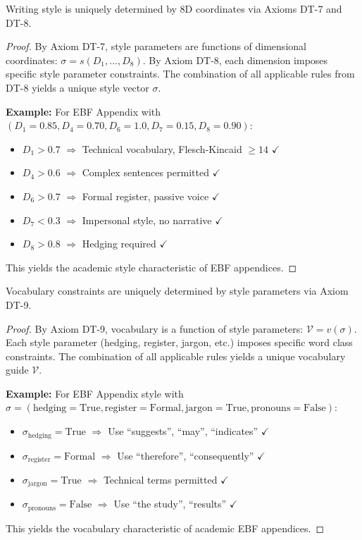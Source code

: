 \begin{proposition}
Writing style is uniquely determined by 8D coordinates via Axioms DT-7 and DT-8.
\end{proposition}

\begin{proof}
By Axiom DT-7, style parameters are functions of dimensional coordinates: $\sigma = s(D_1, ..., D_8)$.
By Axiom DT-8, each dimension imposes specific style parameter constraints.
The combination of all applicable rules from DT-8 yields a unique style vector $\sigma$.

\textbf{Example:} For EBF Appendix with $(D_1=0.85, D_4=0.70, D_6=1.0, D_7=0.15, D_8=0.90)$:
\begin{itemize}[nosep]
\item $D_1 > 0.7$ $\Rightarrow$ Technical vocabulary, Flesch-Kincaid $\geq 14$ $\checkmark$
\item $D_4 > 0.6$ $\Rightarrow$ Complex sentences permitted $\checkmark$
\item $D_6 > 0.7$ $\Rightarrow$ Formal register, passive voice $\checkmark$
\item $D_7 < 0.3$ $\Rightarrow$ Impersonal style, no narrative $\checkmark$
\item $D_8 > 0.8$ $\Rightarrow$ Hedging required $\checkmark$
\end{itemize}
This yields the academic style characteristic of EBF appendices.
\end{proof}

\begin{proposition}
Vocabulary constraints are uniquely determined by style parameters via Axiom DT-9.
\end{proposition}

\begin{proof}
By Axiom DT-9, vocabulary is a function of style parameters: $\mathcal{V} = v(\sigma)$.
Each style parameter (hedging, register, jargon, etc.) imposes specific word class constraints.
The combination of all applicable rules yields a unique vocabulary guide $\mathcal{V}$.

\textbf{Example:} For EBF Appendix style with $\sigma = (\text{hedging}=\text{True},
\text{register}=\text{Formal}, \text{jargon}=\text{True}, \text{pronouns}=\text{False})$:
\begin{itemize}[nosep]
\item $\sigma_{\text{hedging}}=\text{True}$ $\Rightarrow$ Use ``suggests'', ``may'', ``indicates'' $\checkmark$
\item $\sigma_{\text{register}}=\text{Formal}$ $\Rightarrow$ Use ``therefore'', ``consequently'' $\checkmark$
\item $\sigma_{\text{jargon}}=\text{True}$ $\Rightarrow$ Technical terms permitted $\checkmark$
\item $\sigma_{\text{pronouns}}=\text{False}$ $\Rightarrow$ Use ``the study'', ``results'' $\checkmark$
\end{itemize}
This yields the vocabulary characteristic of academic EBF appendices.
\end{proof}

